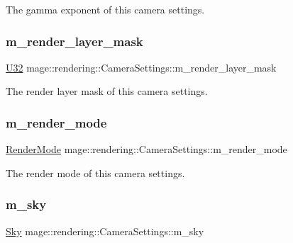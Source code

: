 The gamma exponent of this camera settings. \hypertarget{classmage_1_1rendering_1_1_camera_settings_ab6d4995fe7531563c5c5c8db1a0a1c9f}{}\label{classmage_1_1rendering_1_1_camera_settings_ab6d4995fe7531563c5c5c8db1a0a1c9f} 
\subsubsection{\texorpdfstring{m\+\_\+render\+\_\+layer\+\_\+mask}{m\_render\_layer\_mask}}
{\footnotesize\ttfamily \hyperlink{namespacemage_a41c104c036fba3756a74e19f793eeaa1}{U32} mage\+::rendering\+::\+Camera\+Settings\+::m\+\_\+render\+\_\+layer\+\_\+mask\hspace{0.3cm}{\ttfamily [private]}}

The render layer mask of this camera settings. \hypertarget{classmage_1_1rendering_1_1_camera_settings_adf563f8bd1ee5cecd126c6b4731de6e5}{}\label{classmage_1_1rendering_1_1_camera_settings_adf563f8bd1ee5cecd126c6b4731de6e5} 
\subsubsection{\texorpdfstring{m\+\_\+render\+\_\+mode}{m\_render\_mode}}
{\footnotesize\ttfamily \hyperlink{namespacemage_1_1rendering_aeb14ce7610cc9391f4e01be027b91dcc}{Render\+Mode} mage\+::rendering\+::\+Camera\+Settings\+::m\+\_\+render\+\_\+mode\hspace{0.3cm}{\ttfamily [private]}}

The render mode of this camera settings. \hypertarget{classmage_1_1rendering_1_1_camera_settings_a62c726791db2c8ee20ef404e15c5f26c}{}\label{classmage_1_1rendering_1_1_camera_settings_a62c726791db2c8ee20ef404e15c5f26c} 
\subsubsection{\texorpdfstring{m\+\_\+sky}{m\_sky}}
{\footnotesize\ttfamily \hyperlink{classmage_1_1rendering_1_1_sky}{Sky} mage\+::rendering\+::\+Camera\+Settings\+::m\+\_\+sky\hspace{0.3cm}{\ttfamily [private]}}

